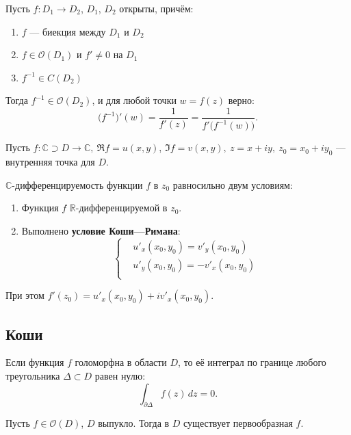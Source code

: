 \begin{theorem}
Пусть $f\colon D_1\to D_2$, $D_1$, $D_2$ открыты, причём:
\begin{enumerate}
  \item $f$ --- биекция между $D_1$ и $D_2$
  \item $f\in\mathcal{O}(D_1)$ и $f'\neq 0$ на $D_1$
  \item $f^{-1}\in C(D_2)$
\end{enumerate}

 Тогда $f^{-1}\in\mathcal{O}(D_2)$, и для любой точки $w = f(z)$ верно:
\[
\bigl( f^{-1} \bigr)'(w) = \frac{1}{f'(z)} = \frac{1}{f'\bigl(f^{-1}(w)\bigr)}.
\]
\end{theorem}

\begin{theorem}
  Пусть $f\colon\mathbb{C}\supset D\to\mathbb{C},\ \Re f=u(x,y)$, $\Im f=v(x,y),\ z=x+iy,\ z_0=x_0+iy_0$ --- внутренняя точка для $D$.

  $\mathbb{C}$-дифференцируемость функции $f$ в $z_0$ равносильно двум условиям:
  \begin{enumerate}
    \item Функция $f$ $\mathbb{R}$-дифференцируемой в $z_0$.
    \item Выполнено \textbf{условие Коши---Римана}:
    \[ \begin{cases*}
      &u'_x(x_0,y_0)=v'_y(x_0,y_0)\\
      &u'_y(x_0,y_0)=-v'_x(x_0,y_0)\\
    \end{cases*} \]
  \end{enumerate}

  При этом $f'(z_0)=u'_x(x_0,y_0)+iv'_x(x_0,y_0)$.
\end{theorem}

\subsection{Коши}

\begin{lemma}
Если функция $f$ голоморфна в области $D$, то её интеграл по границе любого треугольника $\Delta \subset D$ равен нулю:
\[
\int_{\partial \Delta} f(z) \, dz = 0.
\]
\end{lemma}

\begin{theorem}
Пусть \( f\in\mathcal{O}(D) \), $D$ выпукло. Тогда в $D$ существует первообразная $f$.
\end{theorem}


